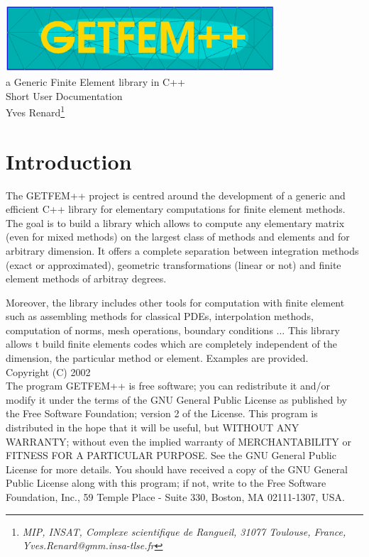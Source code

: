 \documentclass[11pt,a4paper]{article}
\begin{document}
\begin{center}
  \includegraphics[width=10cm,angle=0]{getfem_logo.eps}\\[0.2cm]
  a Generic Finite Element library in C++ \\[0.5cm]
  {\Huge \sc Short User Documentation} \\[0.5cm]
  { \large Yves \sc Renard\footnote{ \it MIP, INSAT, Complexe scientifique de Rangueil, 31077 Toulouse, France, Yves.Renard@gmm.insa-tlse.fr } } \\[1.0cm]
\end{center}




\section*{Introduction}


The GETFEM++ project is centred around the development of a generic and efficient C++ library for elementary computations for finite element methods. The goal is to build a library which allows to compute any elementary matrix (even for mixed methods) on the largest class of methods and elements and for arbitrary dimension. It offers a complete separation between integration methods (exact or approximated), geometric transformations (linear or not) and finite element methods of arbitray degrees.

 Moreover, the library includes other tools for computation with finite element such as assembling methods for classical PDEs, interpolation methods, computation of norms, mesh operations, boundary conditions ... This library allows t build finite elements codes which are completely independent of the dimension, the particular method or element. Examples are provided.\\[5cm]
Copyright (C) 2002\\
The program GETFEM++ is free software; you can redistribute it and/or modify
it under the terms of the GNU General Public License as published by
the Free Software Foundation; version 2 of the License.
This program is distributed in the hope that it will be useful,
but WITHOUT ANY WARRANTY; without even the implied warranty of
MERCHANTABILITY or FITNESS FOR A PARTICULAR PURPOSE.  See the
GNU General Public License for more details.
You should have received a copy of the GNU General Public License
along with this program; if not, write to the Free Software Foundation,
Inc., 59 Temple Place - Suite 330, Boston, MA  02111-1307, USA.
\end{document}
